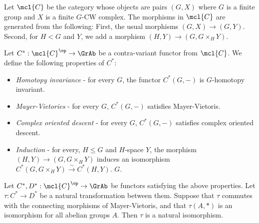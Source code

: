 \begin{definition}
	Let $\mcl{C}$ be the category whose objects are pairs $\left(G, X\right)$ where $G$ is a finite group and $X$ is a finite $G$-CW complex.
	The morphisms in $\mcl{C}$ are generated from the following:
	First, the usual morphisms $\left(G, X\right) \to \left(G, Y\right)$.
	Second, for $H < G$ and $Y$, we add a morphism $\left(H, Y\right) \to \left(G, G \times_H Y\right)$.
\end{definition}

\begin{definition}
	Let $C^*: \mcl{C}^\op \to \GrAb$ be a contra-variant functor from $\mcl{C}$.
	We define the following properties of $C^*$:
	\begin{itemize}
		\item \emph{Homotopy invariance} - for every $G$, the functor $C^*\left(G, -\right)$ is $G$-homotopy invariant.
		\item \emph{Mayer-Vietories} - for every $G$, $C^*\left(G, -\right)$ satisfies Mayer-Vietoris.
		\item \emph{Complex oriented descent} - for every $G$, $C^*\left(G, -\right)$ satisfies complex oriented descent.
		\item \emph{Induction} - for every, $H \leq G$ and $H$-space $Y$, the morphism $\left(H, Y\right) \to \left(G, G \times_H Y\right)$ induces an isomorphism $C^*\left(G, G \times_H Y\right) \xrightarrow{\sim} C^*\left(H, Y\right)$. $G$.
	\end{itemize}
\end{definition}

\begin{theorem}\label{cmplx-oriented-natural-transformation}
	Let $C^*, D^*: \mcl{C}^\op \to \GrAb$ be functors satisfying the above properties.
	Let $\tau: C^* \to D^*$ be a natural transformation between them.
	Suppose that $\tau$ commutes with the connecting morphisms of Mayer-Vietoris, and that $\tau\left(A, *\right)$ is an isomorphism for all abelian groups $A$.
	Then $\tau$ is a natural isomorphism.
\end{theorem}

